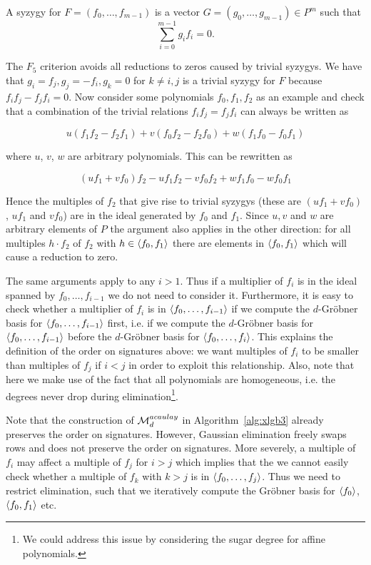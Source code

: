 \begin{definition}
A syzygy for $F = (f_0, \dots, f_{m-1})$ is a vector $G = (g_0, \dots, g_{m-1}) \in P^m$ such that $$\sum_{i=0}^{m-1} g_if_i = 0.$$
\end{definition}

The $F_5$ criterion avoids all reductions to zeros caused by trivial syzygys. We have that $g_i = f_j, g_j = -f_i, g_k = 0$ for $k\neq i,j$ is a trivial syzygy for $F$ because $f_if_j - f_jf_i = 0.$ Now consider some polynomials $f_0,f_1,f_2$ as an example and check that a combination of the trivial relations $f_i f_j = f_j f_i$ can always be written as

      $$u(f_1f_2 - f_2f_1) + v(f_0f_2 - f_2f_0) + w(f_1f_0 - f_0f_1)$$

where $u$, $v$, $w$ are arbitrary polynomials. This can be rewritten as

       $$(uf_1 + vf_0)f_2 - uf_1f_2 - vf_0f_2 + wf_1f_0 - wf_0f_1$$

Hence the multiples of $f_2$ that give rise to trivial syzygys (these are $(uf_1 + vf_0)$, $uf_1$ and $vf_0$) are in the ideal generated by $f_0$ and $f_1$. Since $u,v$ and $w$ are arbitrary elements of $P$ the argument also applies in the other direction: for all multiples $h \cdot f_2$ of $f_2$ with $h \in \langle {f_0,f_1} \rangle$ there are elements in $\langle {f_0, f_1} \rangle$ which will cause a reduction to zero.

The same arguments apply to any $i>1$. Thus if a multiplier of $f_i$ is in the ideal spanned by $f_0,\dots,f_{i-1}$ we do not need to consider it. Furthermore, it is easy to check whether a multiplier of $f_i$ is in $\langle {f_0,\dots,f_{i-1}} \rangle$ if we compute the $d$-Gröbner basis for $\langle {f_0,\dots,f_{i-1}} \rangle$ first, i.e. if we compute the $d$-Gröbner basis for $\langle {f_0,\dots,f_{i-1}} \rangle$ before the $d$-Gröbner basis for $\langle {f_0,\dots,f_{i}} \rangle$. This explains the definition of the order on signatures above: we want multiples of $f_i$ to be smaller than multiples of $f_j$ if $i<j$ in order to exploit this relationship. Also, note that here we make use of the fact that all polynomials are homogeneous, i.e. the degrees never drop during elimination\footnote{We could address this issue by considering the sugar degree \cite[p.108]{Cox2005} for affine polynomials.}.

Note that the construction of $\mathcal{M}^{acaulay}_{d}$ in Algorithm~\ref{alg:xlgb3} already preserves the order on signatures. However, Gaussian elimination freely swaps rows and does not preserve the order on signatures. More severely, a multiple of $f_i$ may affect a multiple of $f_j$ for $i>j$ which implies that the we cannot easily check whether a multiple of $f_k$ with $k>j$ is in $\langle {f_0,\dots,f_{j}} \rangle$. Thus we need to restrict elimination, such that we iteratively compute the Gröbner basis for $\langle {f_0} \rangle$, $\langle {f_0, f_1} \rangle$ etc.

